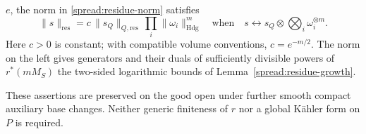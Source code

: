 \begin{proposition}
\begin{enumerate}[label=\textup{(\roman*)}]
\(e\), the norm in \eqref{spread:residue-norm} satisfies
\begin{equation}\label{spread:norm-product}
 \|s\|_{\mathrm{res}}
   =c\,\|s_Q\|_{Q,\mathrm{res}}\,
                   \prod_i\|\omega_i\|_{\mathrm{Hdg}}^m
 \quad\text{when}\quad
 s\longleftrightarrow
       s_Q\otimes\bigotimes_i\omega_i^{\otimes m}.
\end{equation}
Here \(c>0\) is constant; with compatible volume conventions,
\(c=e^{-m/2}\).  The norm on the left gives generators and their duals
of sufficiently divisible powers of \(r^*(mM_S)\) the two-sided
logarithmic bounds of Lemma~\ref{spread:residue-growth}.
\end{enumerate}
These assertions are preserved on the good open under further smooth
compact auxiliary base changes.  Neither generic finiteness of \(r\)
nor a global K\"ahler form on \(P\) is required.
\end{proposition}

